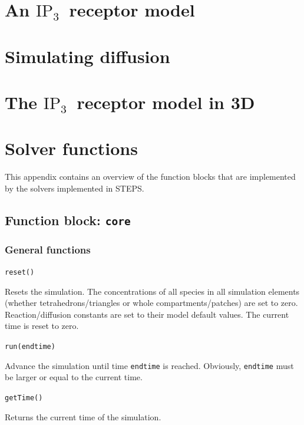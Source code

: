 \documentclass[a4paper,12pt]{book}
\newcommand{\inspt}[0]{\ensuremath{\textrm{IP}_3}}
\begin{document}
\chapter{An \inspt\ receptor model}

\chapter{Simulating diffusion}

\chapter{The \inspt\ receptor model in 3D}

\appendix

\chapter{Solver functions}\label{app:solverfunctions}

This appendix contains an overview of the function blocks that are implemented by the solvers implemented in STEPS.

\section{Function block: \texttt{core}}\label{app:solverfunctions:core}

\subsection{General functions}
{\setlength{\parskip}{12pt} \setlength{\parindent}{0pt}

\texttt{reset()}

Resets the simulation. The concentrations of all species in all simulation elements (whether tetrahedrons/triangles or whole compartments/patches) are set to zero. Reaction/diffusion constants are set to their model default values. The current time is reset to zero.

\texttt{run(endtime)}

Advance the simulation until time \texttt{endtime} is reached. Obviously, \texttt{endtime} must be larger or equal to the current time.

\texttt{getTime()}

Returns the current time of the simulation.
}
\end{document}
